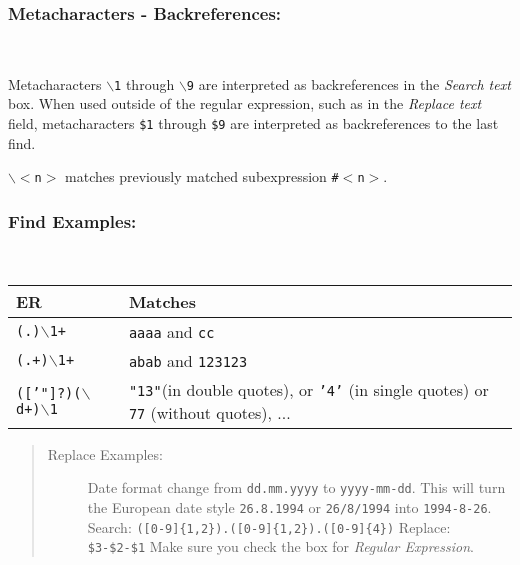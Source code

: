 \subsubsection{Metacharacters - Backreferences:}\\

Metacharacters \texttt{$\backslash$1} through \texttt{$\backslash$9}
are interpreted as backreferences in the \textit{Search text} box. When
used outside of the regular expression, such as in the \textit{Replace
  text} field, metacharacters \texttt{\$1} through \texttt{\$9} are
interpreted as backreferences to the last find.

\texttt{$\backslash$$<$n$>$} matches previously matched subexpression
\texttt{\#$<$n$>$}.


\subsubsection{Find Examples:}\\

\begin{footnotesize}
  \begin{tabularx}{\textwidth}{>{\hsize=0.3\hsize}X>{\hsize=0.7\hsize}X}\\
    \hline
    \textbf{ER} & \textbf{Matches} \\
    \hline
    \texttt{(.)$\backslash$1+} & \texttt{aaaa} and \texttt{cc} \\
    \texttt{(.+)$\backslash$1+} & \texttt{abab} and \texttt{123123} \\
    \texttt{(['"]?)($\backslash$d+)$\backslash$1} & \texttt{"13"}(in double quotes),
    or \texttt{'4'} (in single quotes) or \texttt{77} (without quotes), ... \\
    \hline
  \end{tabularx}
\end{footnotesize}

\begin{quote}
  \begin{footnotesize}
    \begin{description}
      \item[Replace Examples:]
        Date format change from \texttt{dd.mm.yyyy} to \texttt{yyyy-mm-dd}. This will
        turn the European date style \texttt{26.8.1994} or \texttt{26/8/1994}
        into \texttt{1994-8-26}.
        Search: \texttt{([0-9]\{1,2\}).([0-9]\{1,2\}).([0-9]\{4\})}
        Replace: \texttt{\$3-\$2-\$1}
        Make sure you check the box for \textit{Regular Expression}.
    \end{description}
  \end{footnotesize}
\end{quote}


